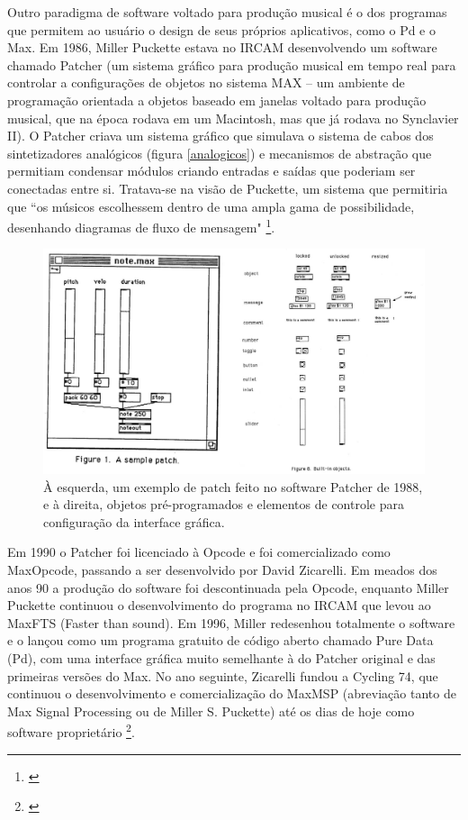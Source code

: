 Outro paradigma de software voltado para produção musical é o dos programas que permitem ao usuário o design de seus próprios aplicativos, como o Pd e o Max. Em 1986, Miller Puckette estava no IRCAM desenvolvendo um software chamado Patcher (um sistema gráfico para produção musical em tempo real para controlar a configurações de objetos no sistema MAX – um ambiente de programação orientada a objetos baseado em janelas voltado para produção musical, que na época rodava em um Macintosh, mas que já rodava no Synclavier II). O Patcher criava um sistema gráfico que simulava o sistema de cabos dos sintetizadores analógicos (figura \ref{analogicos}) e mecanismos de abstração que permitiam condensar módulos criando entradas e saídas que poderiam ser conectadas entre si. Tratava-se na visão de Puckette, um sistema que permitiria que ``os músicos escolhessem dentro de uma ampla gama de possibilidade, desenhando diagramas de fluxo de mensagem" \footnote{\cite[p. 5]{PucketteMiller}}. 

\begin{figure}
    \caption{\label{patcher}À esquerda, um exemplo de patch feito no software Patcher de 1988, e à direita, objetos pré-programados e elementos de controle para configuração da interface gráfica.}
    
        \includegraphics[width=1\linewidth]{pictures/cap2/patcher}
    
\end{figure}


Em 1990 o Patcher foi licenciado à Opcode e foi comercializado como Max\/Opcode, passando a ser desenvolvido por David Zicarelli. Em meados dos anos 90 a produção do software foi descontinuada pela Opcode, enquanto Miller Puckette continuou o desenvolvimento do programa no IRCAM que levou ao Max\/FTS (Faster than sound). Em 1996, Miller redesenhou totalmente o software e o lançou como um programa gratuito de código aberto chamado Pure Data (Pd), com uma interface gráfica muito semelhante à do Patcher original e das primeiras versões do Max. No ano seguinte, Zicarelli fundou a Cycling 74, que continuou o desenvolvimento e comercialização do Max\/MSP (abreviação tanto de Max Signal Processing ou de Miller S. Puckette) até os dias de hoje como software proprietário \footnote{\cite{Cryer2018}}.


